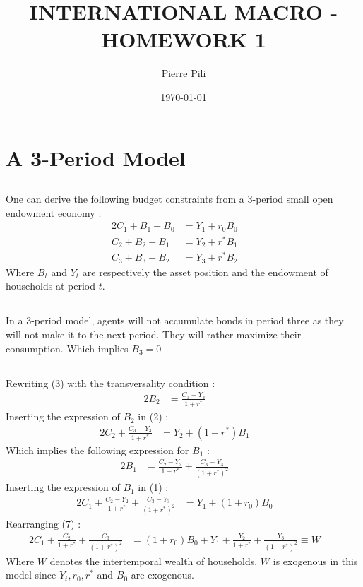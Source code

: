 \documentclass{article}
\title{INTERNATIONAL MACRO - HOMEWORK 1}
\author{Pierre Pili}
\date{\today}
\begin{document}
\begin{titlingpage}
\maketitle
\end{titlingpage}

\tableofcontents

\newpage
\section{A 3-Period Model}
\subsection{}
One can derive the following budget constraints from a 3-period small open endowment economy :
\begin{alignat}{2}
    C_1 + B_1 - B_0 &= Y_1 + r_0 B_0  \quad&\\
    C_2 + B_2 - B_1 &= Y_2 + r^* B_1  \quad&\\
    C_3 + B_3 - B_2 &= Y_3 + r^* B_2  \quad&
  \end{alignat}
Where $B_t$ and $Y_t$ are respectively the asset position and the endowment of households at period $t$.
\subsection{}
In a 3-period model, agents will not accumulate bonds in period three as they will not make it to the next period. They will rather maximize their consumption. Which implies $B_3 = 0$
\subsection{}
Rewriting (3) with the transversality condition :
\begin{alignat}{2}
    B_2 &= \frac{C_3 - Y_3}{1+r^*}  \quad&
\end{alignat}
Inserting the expression of $B_2$ in (2) :
\begin{alignat}{2}
    C_2 + \frac{C_3 - Y_3}{1+r^*} &= Y_2 + (1+r^*)B_1  \quad&
\end{alignat}
Which implies the following expression for $B_1$ :
\begin{alignat}{2}
    B_1 &= \frac{C_2 - Y_2}{1+r^*} + \frac{C_3 - Y_3}{(1+r^*)^2}  \quad&
\end{alignat}
Inserting the expression of $B_1$ in (1) :
\begin{alignat}{2}
    C_1 + \frac{C_2 - Y_2}{1+r^*} + \frac{C_3 - Y_3}{(1+r^*)^2} &= Y_1 + (1+r_0)B_0  \quad&
\end{alignat}
Rearranging (7) :
\begin{alignat}{2}
    C_1 + \frac{C_2}{1+r^*} + \frac{C_3}{(1+r^*)^2} &= (1+r_0)B_0 + Y_1 + \frac{Y_2}{1+r^*} + \frac{Y_3}{(1+r^*)^2} \equiv W \quad&
\end{alignat}
Where $W$ denotes the intertemporal wealth of households. $W$ is exogenous in this model since $Y_t, r_0, r^*$ and $B_0$ are exogenous.
\end{document}
